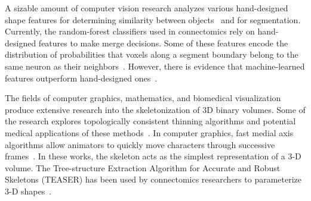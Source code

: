 A sizable amount of computer vision research analyzes various hand-designed shape features for determining similarity between objects~\cite{osada2002shape} and for segmentation\cite{conners1984segmentation}. 
Currently, the random-forest classifiers used in connectomics rely on hand-designed features to make merge decisions.
Some of these features encode the distribution of probabilities that voxels along a segment boundary belong to the same neuron as their neighbors~\cite{nunez2014graph,ren2003learning}.
However, there is evidence that machine-learned features outperform hand-designed ones~\cite{bogovic2013learned}.

The fields of computer graphics, mathematics, and biomedical visualization produce extensive research into the skeletonization of 3D binary volumes. 
Some of the research explores topologically consistent thinning algorithms and potential medical applications of these methods~\cite{palagyi20003d,palagyi2001sequential}. 
In computer graphics, fast medial axis algorithms allow animators to quickly move characters through successive frames~\cite{baran2007automatic,bharaj2012automatically}. 
In these works, the skeleton acts as the simplest representation of a 3-D volume. 
The Tree-structure Extraction Algorithm for Accurate and Robust Skeletons (TEASER) has been used by connectomics researchers to parameterize 3-D shapes~\cite{sato2000teasar,zhao2014automatic}. 